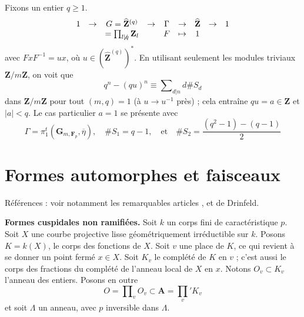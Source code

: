 \begin{example}
\label{example-commutative}
Fixons un entier $q\geq 1$.
$$
\begin{matrix}
1 &
\to &
G = \widehat{\mathbf{Z}}^{(q)} &
\to &
\Gamma &
\to &
\widehat{\mathbf{Z}} &
\to &
1 \\
&
&
= \prod_{l\not \mid q} \mathbf{Z}_l &
&
F &
\mapsto &
1
\end{matrix}
$$
avec $FxF^{-1} = ux$, où $u \in (\widehat{\mathbf{Z}}^{(q)})^*$.
En utilisant seulement les modules triviaux
$\mathbf{Z}/m\mathbf{Z}$, on voit que
$$
q^n - (qu)^n \equiv \sum\nolimits_{d|n} d\# S_d
$$
dans $\mathbf{Z}/m\mathbf{Z}$ pour tout $(m, q)=1$ (à
$u \to u^{-1}$ près) ; cela entraîne $qu = a\in \mathbf{Z}$
et $|a| < q$. Le cas particulier $a = 1$ se présente avec
$$
\Gamma = \pi_1^t(\mathbf{G}_{m, \mathbf{F}_p}, \overline \eta),
\quad
\# S_1 = q - 1,
\quad\text{et}\quad
\# S_2 = \frac{(q^2-1)-(q-1)}{2}
$$
\end{example}



\section{Formes automorphes et faisceaux}
\label{section-automorphic}

\noindent
Références : voir notamment les remarquables articles
\cite{D1}, \cite{D2} et \cite{D0} de Drinfeld.

\medskip\noindent
{\bf Formes cuspidales non ramifiées.}
Soit $k$ un corps fini de caractéristique $p$.
Soit $X$ une courbe projective lisse géométriquement irréductible sur $k$.
Posons $K = k(X)$, le corps des fonctions de $X$.
Soit $v$ une place de $K$, ce qui revient à se donner un
point fermé $x\in X$. Soit $K_v$ le complété de $K$ en $v$ ;
c'est aussi le corps des fractions du complété de
l'anneau local de $X$ en $x$.
Notons $O_v\subset K_v$ l'anneau des entiers. Posons en outre
$$
O = \prod\nolimits_v O_v \subset \mathbf{A} = \prod_v' K_v
$$
et soit $\Lambda$ un anneau, avec $p$ inversible dans $\Lambda$.

